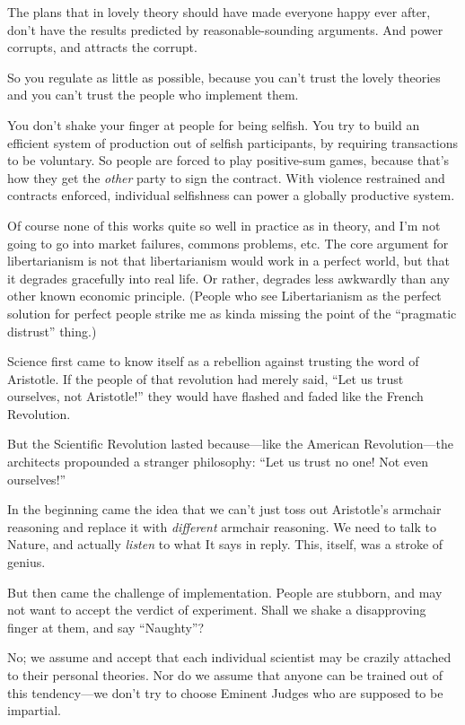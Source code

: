 {
 The plans that in lovely theory should have made everyone happy
ever after, don't have the results predicted by
reasonable-sounding arguments. And power corrupts, and attracts the
corrupt.}

{
 So you regulate as little as possible, because you
can't trust the lovely theories and you
can't trust the people who implement them.}

{
 You don't shake your finger at people for being
selfish. You try to build an efficient system of production out of
selfish participants, by requiring transactions to be voluntary. So
people are forced to play positive-sum games, because
that's how they get the \textit{other} party to sign
the contract. With violence restrained and contracts enforced,
individual selfishness can power a globally productive system.}

{
 Of course none of this works quite so well in practice as in
theory, and I'm not going to go into market failures,
commons problems, etc. The core argument for libertarianism is not that
libertarianism would work in a perfect world, but that it degrades
gracefully into real life. Or rather, degrades less awkwardly than any
other known economic principle. (People who see Libertarianism as the
perfect solution for perfect people strike me as kinda missing the
point of the ``pragmatic distrust''
thing.)}

{
 Science first came to know itself as a rebellion against trusting
the word of Aristotle. If the people of that revolution had merely
said, ``Let us trust ourselves, not
Aristotle!'' they would have flashed and faded like
the French Revolution.}

{
 But the Scientific Revolution lasted because---like the American
Revolution---the architects propounded a stranger philosophy:
``Let us trust no one! Not even
ourselves!''}

{
 In the beginning came the idea that we can't just
toss out Aristotle's armchair reasoning and replace it
with \textit{different} armchair reasoning. We need to talk to Nature,
and actually \textit{listen} to what It says in reply. This, itself,
was a stroke of genius.}

{
 But then came the challenge of implementation. People are
stubborn, and may not want to accept the verdict of experiment. Shall
we shake a disapproving finger at them, and say
``Naughty''?}

{
 No; we assume and accept that each individual scientist may be
crazily attached to their personal theories. Nor do we assume that
anyone can be trained out of this tendency---we don't
try to choose Eminent Judges who are supposed to be impartial.}

